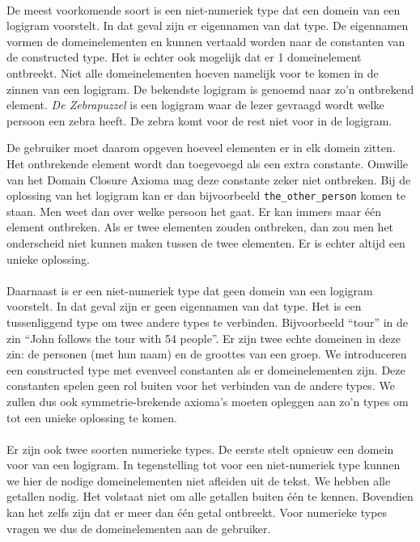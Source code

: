 \paragraph{} De meest voorkomende soort is een niet-numeriek type dat een domein van een logigram voorstelt. In dat geval zijn er eigennamen van dat type. De eigennamen vormen de domeinelementen en kunnen vertaald worden naar de constanten van de constructed type. Het is echter ook mogelijk dat er 1 domeinelement ontbreekt. Niet alle domeinelementen hoeven namelijk voor te komen in de zinnen van een logigram. De bekendste logigram is genoemd naar zo'n ontbrekend element. \textit{De Zebrapuzzel} is een logigram waar de lezer gevraagd wordt welke persoon een zebra heeft. De zebra komt voor de rest niet voor in de logigram.

De gebruiker moet daarom opgeven hoeveel elementen er in elk domein zitten. Het ontbrekende element wordt dan toegevoegd als een extra constante. Omwille van het Domain Closure Axioma mag deze constante zeker niet ontbreken. Bij de oplossing van het logigram kan er dan bijvoorbeeld \texttt{the\_other\_person} komen te staan. Men weet dan over welke persoon het gaat. Er kan immers maar één element ontbreken. Als er twee elementen zouden ontbreken, dan zou men het onderscheid niet kunnen maken tussen de twee elementen. Er is echter altijd een unieke oplossing.

\paragraph{} Daarnaast is er een niet-numeriek type dat geen domein van een logigram voorstelt. In dat geval zijn er geen eigennamen van dat type. Het is een tussenliggend type om twee andere types te verbinden. Bijvoorbeeld ``tour'' in de zin ``John follows the tour with 54 people''. Er zijn twee echte domeinen in deze zin: de personen (met hun naam) en de groottes van een groep. We introduceren een constructed type met evenveel constanten als er domeinelementen zijn. Deze constanten spelen geen rol buiten voor het verbinden van de andere types. We zullen dus ook symmetrie-brekende axioma's moeten opleggen aan zo'n types om tot een unieke oplossing te komen.

\paragraph{} Er zijn ook twee soorten numerieke types. De eerste stelt opnieuw een domein voor van een logigram. In tegenstelling tot voor een niet-numeriek type kunnen we hier de nodige domeinelementen niet afleiden uit de tekst. We hebben alle getallen nodig. Het volstaat niet om alle getallen buiten één te kennen. Bovendien kan het zelfs zijn dat er meer dan één getal ontbreekt. Voor numerieke types vragen we dus de domeinelementen aan de gebruiker.


